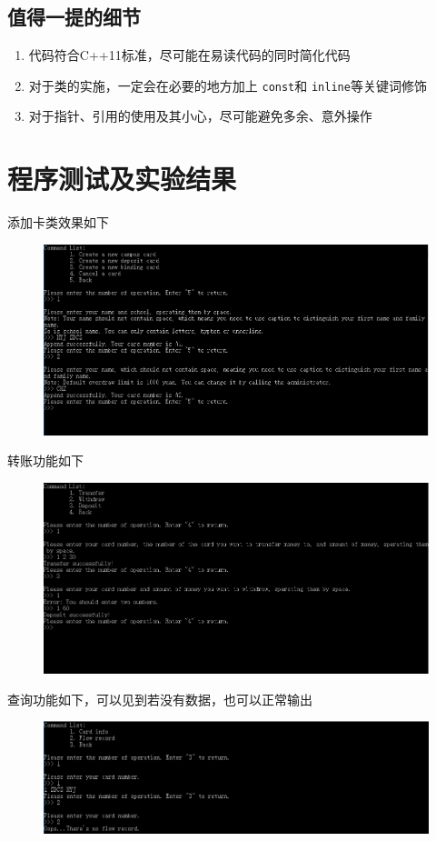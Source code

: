 \documentclass[11pt,UTF8]{ctexart}
\begin{document}
\subsection{值得一提的细节}
\begin{enumerate}
	\item 代码符合C++11标准，尽可能在易读代码的同时简化代码
	\item 对于类的实施，一定会在必要的地方加上 \verb'const'和 \verb'inline'等关键词修饰
	\item 对于指针、引用的使用及其小心，尽可能避免多余、意外操作
\end{enumerate}


\section{程序测试及实验结果}
\par 添加卡类效果如下
\begin{figure}[H]
\centering
\includegraphics[width=0.6\linewidth]{pic/new_card.PNG}
\end{figure}
\par 转账功能如下
\begin{figure}[H]
\centering
\includegraphics[width=0.6\linewidth]{pic/transfer.PNG}
\end{figure}
\par 查询功能如下，可以见到若没有数据，也可以正常输出
\begin{figure}[H]
\centering
\includegraphics[width=0.6\linewidth]{pic/query.PNG}
\end{figure}
\end{document}
